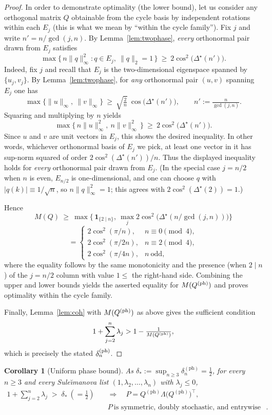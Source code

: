 \documentclass[12pt,fleqn]{amsart}
\renewcommand{\le}{\leqslant}
\renewcommand{\ge}{\geqslant}
\newtheorem{cor}[thm]{Corollary}
\theoremstyle{definition}
\theoremstyle{remark}
\newcommand{\1}{\mathbf{1}}
\begin{document}
\begin{proof}
In order to demonstrate optimality (the lower bound), let us consider any orthogonal matrix $Q$ obtainable from the cycle basis by independent rotations within each $E_j$ (this is what we mean by “within the cycle family”). Fix $j$ and write $n'=n/\gcd(j,n)$. By Lemma~\ref{lem:twophase}, \emph{every} orthonormal pair drawn from $E_j$ satisfies
\[
\max\{\,n\|q\|_\infty^2 : q\in E_j,\ \|q\|_2=1\,\}\ \ge\ 2\cos^2\!\big(\Delta^\star(n')\big).
\]
Indeed, fix $j$ and recall that $E_j$ is the two-dimensional eigenspace
spanned by $\{u_j,v_j\}$. By Lemma~\ref{lem:twophase}, for \emph{any}
orthonormal pair $(u,v)$ spanning $E_j$ one has
\[
\max\{\|u\|_\infty,\ \|v\|_\infty\}\ \ge\ 
\sqrt{\tfrac{2}{n}}\ \cos\!\bigl(\Delta^\star(n')\bigr),
\qquad n':=\tfrac{n}{\gcd(j,n)}.
\]
Squaring and multiplying by $n$ yields
\[
\max\{\,n\|u\|_\infty^2,\ n\|v\|_\infty^2\,\}\ \ge\
2\cos^2\!\bigl(\Delta^\star(n')\bigr).
\]
Since $u$ and $v$ are unit vectors in $E_j$, this shows the desired inequality. 
In other words, whichever orthonormal basis of $E_j$ we pick, at least
one vector in it has sup-norm squared of order $2\cos^2(\Delta^\star(n'))/n$.
Thus the displayed inequality holds for \emph{every} orthonormal pair
drawn from $E_j$. (In the special case $j=n/2$ when $n$ is even, $E_{n/2}$
is one-dimensional, and one can choose $q$ with $|q(k)|\equiv 1/\sqrt{n}$,
so $n\|q\|_\infty^2=1$; this agrees with
$2\cos^2(\Delta^\star(2))=1$.)

Hence
\[
M(Q)\ \ge\ \max\Big\{\,\mathbf{1}_{\{2\mid n\}},\ \max_{j}2\cos^2\!\big(\Delta^\star(n/\gcd(j,n))\big)\Big\}
\]
\[
=\begin{cases}
2\cos^2(\pi/n), & n\equiv 0\pmod 4,\\
2\cos^2(\pi/2n), & n\equiv 2\pmod 4,\\
2\cos^2(\pi/4n), & n\ \text{odd},
\end{cases}
\]
where the equality follows by the same monotonicity and the presence (when $2\mid n$) of the $j=n/2$ column with value $1\le$ the right-hand side. Combining the upper and lower bounds yields the asserted equality for $M(Q^{\rm (ph)})$ and proves optimality within the cycle family.

Finally, Lemma~\ref{lem:coh} with $M(Q^{\rm (ph)})$ as above gives the sufficient condition
\[
1+\sum_{j=2}^n\lambda_j>1-\tfrac{1}{M(Q^{\rm (ph)})},
\]
which is precisely the stated $\delta^{\rm (ph)}_n$.
\end{proof}

\begin{cor}[Uniform phase bound]\label{cor:uniform}
As $\delta_\ast:=\sup_{n\ge3}\delta^{\mathrm{(ph)}}_n=\tfrac12$, for every $n\ge3$ and every Sule\u{\i}manova list $(1,\lambda_2,\ldots,\lambda_n)$ with $\lambda_j\le0$,
\[
\begin{aligned}
1+\sum_{j=2}^{n}\lambda_j \;>\; \delta_\ast\ (= \tfrac12)
\quad &\Longrightarrow\quad
P=Q^{(\mathrm{ph})}\Lambda\big(Q^{(\mathrm{ph})}\big)^{\!\top},\\
& P\ \text{is symmetric, doubly stochastic, and entrywise non-negative}.
\end{aligned}
\]
\end{cor}
\end{document}
